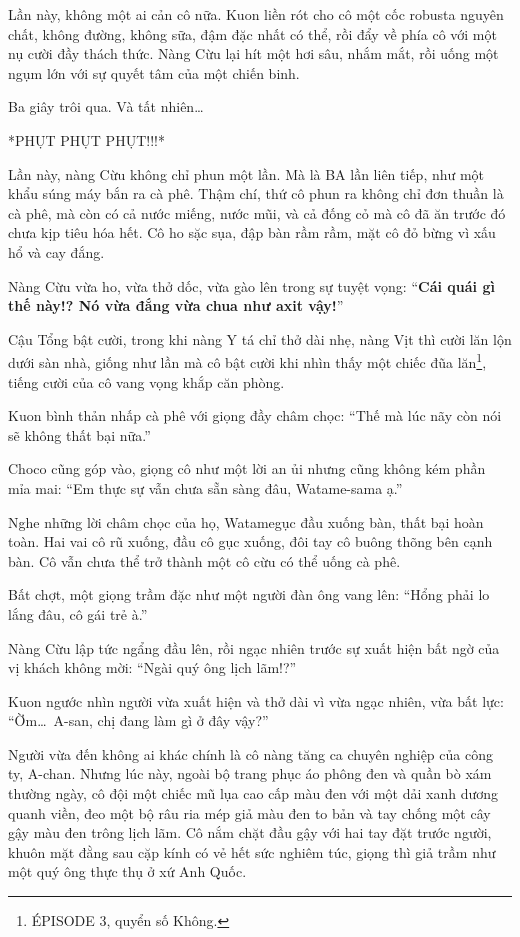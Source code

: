 \documentclass[../main.tex]{subfiles}
\begin{document}
Lần này, không một ai cản cô nữa. Kuon liền rót cho cô một cốc robusta nguyên chất, không đường, không sữa, đậm đặc nhất có thể, rồi đẩy về phía cô với một nụ cười đầy thách thức. Nàng Cừu lại hít một hơi sâu, nhắm mắt, rồi uống một ngụm lớn với sự quyết tâm của một chiến binh.

Ba giây trôi qua. Và tất nhiên\dots

*PHỤT PHỤT PHỤT!!!*

Lần này, nàng Cừu không chỉ phun một lần. Mà là BA lần liên tiếp, như một khẩu súng máy bắn ra cà phê. Thậm chí, thứ cô phun ra không chỉ đơn thuần là cà phê, mà còn có cả nước miếng, nước mũi, và cả đống cỏ mà cô đã ăn trước đó chưa kịp tiêu hóa hết. Cô ho sặc sụa, đập bàn rầm rầm, mặt cô đỏ bừng vì xấu hổ và cay đắng.

Nàng Cừu vừa ho, vừa thở dốc, vừa gào lên trong sự tuyệt vọng: ``\textbf{Cái quái gì thế này!? Nó vừa đắng vừa chua như axit vậy!}''

Cậu Tổng bật cười, trong khi nàng Y tá chỉ thở dài nhẹ, nàng Vịt thì cười lăn lộn dưới sàn nhà, giống như lần mà cô bật cười khi nhìn thấy một chiếc đũa lăn\footnote{{\flaregothic ÉPISODE 3}, quyển số Không.}, tiếng cười của cô vang vọng khắp căn phòng.

Kuon bình thản nhấp cà phê với giọng đầy châm chọc: ``Thế mà lúc nãy còn nói sẽ không thất bại nữa.''

Choco cũng góp vào, giọng cô như một lời an ủi nhưng cũng không kém phần mỉa mai: ``Em thực sự vẫn chưa sẵn sàng đâu, Watame-sama ạ.''

Nghe những lời châm chọc của họ, Watamegục đầu xuống bàn, thất bại hoàn toàn. Hai vai cô rũ xuống, đầu cô gục xuống, đôi tay cô buông thõng bên cạnh bàn. Cô vẫn chưa thể trở thành một cô cừu có thể uống cà phê.

Bất chợt, một giọng trầm đặc như một người đàn ông vang lên: ``Hổng phải lo lắng đâu, cô gái trẻ à.''

Nàng Cừu lập tức ngẩng đầu lên, rồi ngạc nhiên trước sự xuất hiện bất ngờ của vị khách không mời: ``Ngài quý ông lịch lãm!?''


Kuon ngước nhìn người vừa xuất hiện và thở dài vì vừa ngạc nhiên, vừa bất lực: ``Ờm\dots\ A-san, chị đang làm gì ở đây vậy?''

Người vừa đến không ai khác chính là cô nàng tăng ca chuyên nghiệp của công ty, A-chan. Nhưng lúc này, ngoài bộ trang phục áo phông đen và quần bò xám thường ngày, cô đội một chiếc mũ lụa cao cấp màu đen với một dải xanh dương quanh viền, đeo một bộ râu ria mép giả màu đen to bản và tay chống một cây gậy màu đen trông lịch lãm. Cô nắm chặt đầu gậy với hai tay đặt trước người, khuôn mặt đằng sau cặp kính có vẻ hết sức nghiêm túc, giọng thì giả trầm như một quý ông thực thụ ở xứ Anh Quốc.
\end{document}
